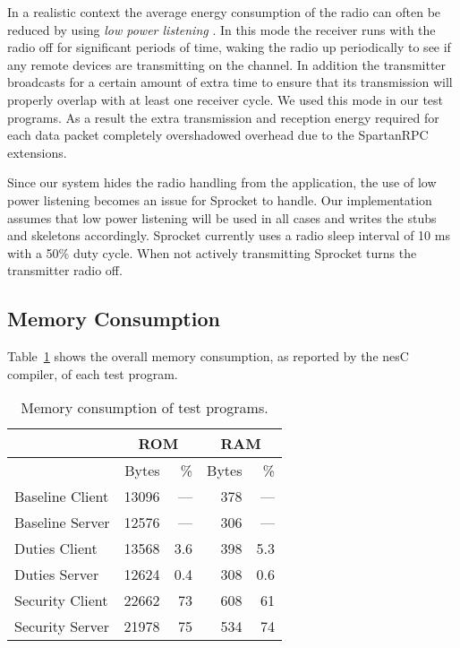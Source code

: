 In a realistic context the average energy consumption of the radio can often be reduced by using
\emph{low power listening} \cite{moss-tep105}. In this mode the receiver runs with the radio off
for significant periods of time, waking the radio up periodically to see if any remote devices
are transmitting on the channel. In addition the transmitter broadcasts for a certain amount of
extra time to ensure that its transmission will properly overlap with at least one receiver
cycle. We used this mode in our test programs. As a result the extra transmission and reception
energy required for each data packet completely overshadowed overhead due to the SpartanRPC
extensions.

Since our system hides the radio handling from the application, the use of low power listening
becomes an issue for Sprocket to handle. Our implementation assumes that low power listening
will be used in all cases and writes the stubs and skeletons accordingly. Sprocket currently
uses a radio sleep interval of 10 ms with a 50\% duty cycle. When not actively transmitting
Sprocket turns the transmitter radio off.

\subsection{Memory Consumption}

Table~\ref{tbl:memory-consumption} shows the overall memory consumption, as reported by the nesC
compiler, of each test program.

\begin{table}[!t]
\newcommand\T{\rule{0pt}{2.1ex}}
\centering
\caption{Memory consumption of test programs.}
\label{tbl:memory-consumption}
\begin{tabular}{|l|rr|rr|} \hline
                   & \multicolumn{2}{|c|}{ROM \T} & \multicolumn{2}{|c|}{RAM} \\ \hline
                   & Bytes \T & \% & Bytes & \%  \\ \hline \hline
Baseline Client \T & 13096 & --- & 378  & --- \\ \hline
Baseline Server \T & 12576 & --- & 306  & --- \\ \hline \hline
Duties Client   \T & 13568 & 3.6 & 398  & 5.3 \\ \hline
Duties Server   \T & 12624 & 0.4 & 308  & 0.6 \\ \hline \hline
Security Client \T & 22662 & 73  & 608  & 61  \\ \hline
Security Server \T & 21978 & 75  & 534  & 74  \\ \hline
\end{tabular}
\end{table}

